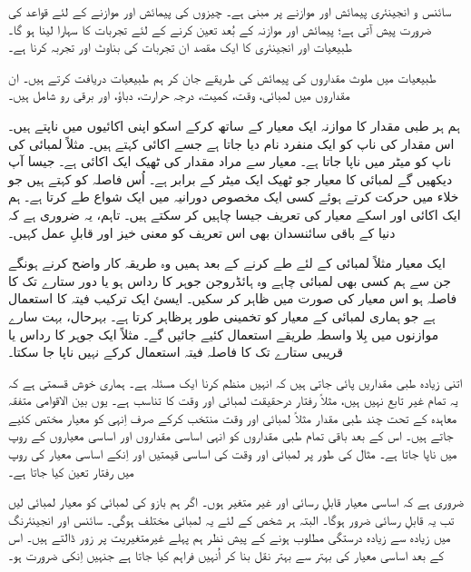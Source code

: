 	سائنس و  انجینئری پیمائش اور موازنے  پر مبنی ہے۔ چیزوں کی پیمائش اور موازنے کے  لئے قواعد کی ضرورت پیش آتی ہے؛  پیمائش اور موازنہ کے  بُعد تعین کرنے کے لئے تجربات کا سہارا لینا  ہو گا۔ طبیعیات اور انجینئری کا ایک مقصد ان تجربات کی بناوٹ اور تجربہ کرنا ہے۔
	
	طبیعیات میں ملوث مقداروں کی پیمائش کی طریقے جان کر ہم طبیعیات دریافت کرتے ہیں۔ ان مقداروں میں لمبائی، وقت، کمیت، درجہ حرارت، دباؤ، اور برقی رو شامل ہیں۔
	
	ہم ہر طبی مقدار کا موازنہ ایک معیار کے ساتھ کرکے اسکو اپنی اکائیوں میں ناپتے ہیں۔ اس مقدار کی ناپ کو ایک منفرد نام دیا جاتا ہے جسے اکائی کہتے ہیں۔ مثلاً لمبائی کی ناپ کو میٹر میں ناپا جاتا ہے۔ معیار سے مراد مقدار کی ٹھیک ایک اکائی ہے۔ جیسا آپ دیکھیں گے لمبائی کا معیار جو ٹھیک ایک میٹر کے برابر ہے۔ اُس فاصلہ کو کہتے ہیں جو خلاء میں حرکت کرتے ہوئے کسی ایک مخصوص دورانیہ میں ایک شواع طے کرتا ہے۔ ہم ایک اکائی اور اسکے معیار کی تعریف جیسا چاہیں کر سکتے ہیں۔ تاہم، یہ ضروری ہے کہ دنیا کے باقی سائنسدان بھی اس تعریف کو معنی خیز اور قابلِ عمل کہیں۔
	
	ایک معیار مثلاً لمبائی کے لئے طے کرنے کے بعد ہمیں وہ طریقہ کار واضح کرنے ہونگے جن سے ہم کسی بھی لمبائی چاہے وہ ہائڈروجن جوہر کا رداس ہو یا دور ستارے تک کا فاصلہ ہو اس معیار کی صورت میں ظاہر کر سکیں۔ ایسئ ایک ترکیب فیتہ کا استعمال ہے جو ہماری لمبائی کے معیار کو تخمینی طور پرظاہر کرتا ہے۔ بہرحال، بہت سارے موازنوں میں بِلا واسطہ طریقے استعمال کئیے جائیں گے۔ مثلاً ایک جوہر کا رداس یا قریبی ستارے تک کا فاصلہ فیتہ استعمال کرکے نہیں ناپا جا سکتا۔
	
	اتنی زیادہ طبی مقداریں پائی جاتی ہیں کہ انہیں منظم کرنا ایک مسئلہ ہے۔ ہماری خوش قسمتی ہے کہ یہ تمام غیر تابع نہیں ہیں، مثلاً رفتار درحقیقت لمبائی اور وقت کا تناسب ہے۔ یوں بین الاقوامی متفقہ معاہدہ کے تحت چند طبی مقدار مثلاً لمبائی اور وقت منتخب کرکے صرف اِنہی کو معیار مختص کئیے جاتے ہیں۔ اس کے بعد باقی تمام طبی مقداروں کو انہی اساسی مقداروں اور اساسی معیاروں کے روپ میں ناپا جاتا ہے۔ مثال کی طور پر لمبائی اور وقت کی اساسی قیمتیں اور اِنکے اساسی معیار کی روپ میں رفتار تعین کیا جاتا ہے۔
	
	ضروری ہے کہ اساسی معیار قابلِ رسائی اور غیر متغیر ہوں۔ اگر ہم بازو کی لمبائی کو معیار لمبائی لیں تب یہ قابلِ رسائی ضرور ہوگا۔ البتہ ہر شخص کے لئے یہ لمبائی مختلف ہوگی۔ سائنس اور انجینئرنگ میں زیادہ سے زیادہ درستگی مطلوب ہونے کے پیش نظر ہم پہلے غیرمتغیریت پر زور ڈالتے ہیں۔ اس کے بعد اساسی معیار کی بہتر سے بہتر نقل بنا کر اُنہیں فراہم کیا جاتا ہے جنہیں اِنکی ضرورت ہو۔


